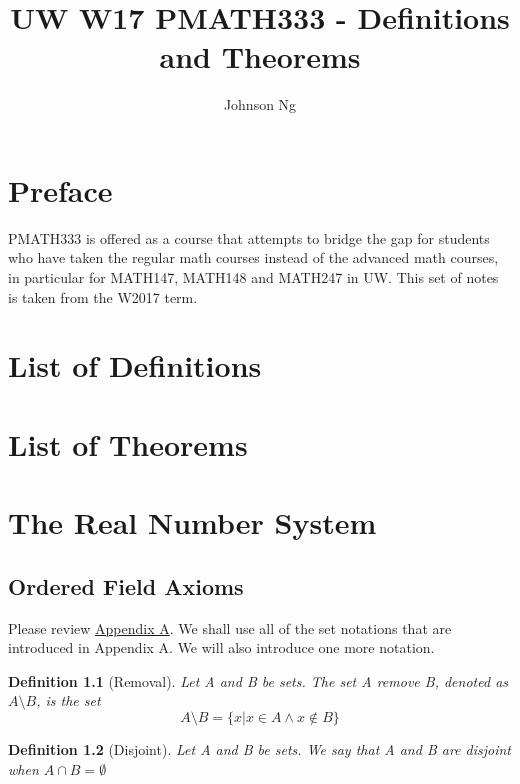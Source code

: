\documentclass[11pt, oneside]{book}
\title{UW W17 PMATH333 - Definitions and Theorems}
\author{Johnson Ng}
\theoremstyle{break}
\newtheorem{defn}{Definition}[section]
\begin{document}
\maketitle

\chapter*{Preface}
PMATH333 is offered as a course that attempts to bridge the gap for students who have taken the regular math courses instead of the advanced math courses, in particular for MATH147, MATH148 and MATH247 in UW. This set of notes is taken from the W2017 term.

\tableofcontents

\chapter*{List of Definitions}

\chapter*{List of Theorems}


\chapter{The Real Number System}

\section{Ordered Field Axioms}
Please review \hyperref[apdxA]{Appendix A}. We shall use all of the set notations that are introduced in Appendix A. We will also introduce one more notation.

\begin{defn}[Removal]
	Let A and B be sets. The set A remove B, denoted as $A \setminus B$, is the set
	\[
		A \setminus B = \{ x | x \in A \land x \notin B \}
	\]
\end{defn}

\begin{defn}[Disjoint]
	Let A and B be sets. We say that A and B are disjoint when $A \cap B = \emptyset$
\end{defn}
\end{document}
